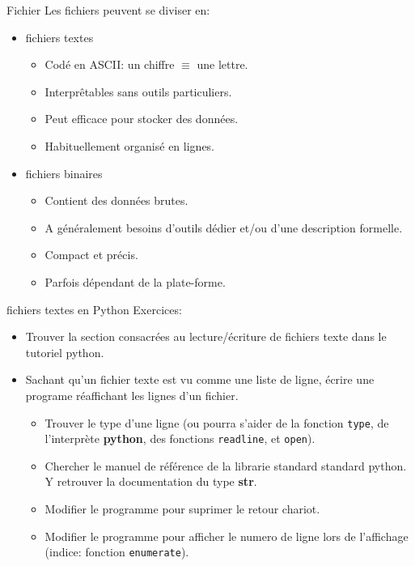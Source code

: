 \documentclass{beamer}
\begin{document}
\begin{frame}{Fichier}
  Les fichiers peuvent se diviser en:
  \begin{itemize}
    \item fichiers textes
      \begin{itemize}
      \item Codé en ASCII: un chiffre $\equiv$ une lettre.
      \item Interprêtables sans outils particuliers.
      \item Peut efficace pour stocker des données.
      \item Habituellement organisé en lignes.
      \end{itemize}
    \item fichiers binaires
      \begin{itemize}
      \item Contient des données brutes.
      \item A généralement besoins d'outils dédier et/ou d'une description formelle.
      \item Compact et précis.
      \item Parfois dépendant de la plate-forme.
      \end{itemize}
  \end{itemize}
\end{frame}

\begin{frame}[fragile]{fichiers textes en Python}
  Exercices:
  \begin{itemize}
  \item Trouver la section consacrées au lecture/écriture de fichiers texte dans le tutoriel python.
  \item Sachant qu'un fichier texte est vu comme une liste de ligne, écrire une programe réaffichant les lignes d'un fichier.
    \begin{itemize}
    \item Trouver le type d'une ligne (ou pourra s'aider de la fonction {\tt type}, de l'interprète {\bf python}, des fonctions {\tt readline}, et {\tt open}).
    \item Chercher le manuel de référence de la librarie standard standard python. Y retrouver la documentation du type {\bf str}.
    \item Modifier le programme pour suprimer le retour chariot.
    \item Modifier le programme pour afficher le numero de ligne lors de l'affichage (indice: fonction {\tt enumerate}).
    \end{itemize}
  \end{itemize}
\end{frame}
\end{document}
